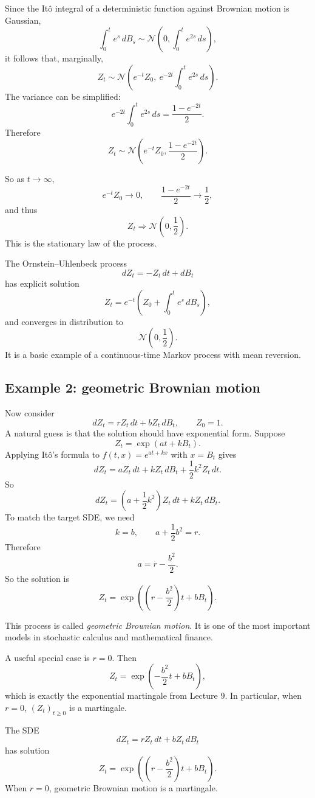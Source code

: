 \documentclass[11pt]{article}
\theoremstyle{definition}
\begin{document}
Since the It\^o integral of a deterministic function against Brownian motion is Gaussian,
\[
\int_0^t e^s\,dB_s
\sim
\mathcal N\!\left(0,\int_0^t e^{2s}\,ds\right),
\]
it follows that, marginally,
\[
Z_t\sim
\mathcal N\!\left(e^{-t}Z_0,\ e^{-2t}\int_0^t e^{2s}\,ds\right).
\]
The variance can be simplified:
\[
e^{-2t}\int_0^t e^{2s}\,ds
=
\frac{1-e^{-2t}}{2}.
\]
Therefore
\[
Z_t\sim \mathcal N\!\left(e^{-t}Z_0,\frac{1-e^{-2t}}{2}\right).
\]

So as $t\to\infty$,
\[
e^{-t}Z_0\to 0,
\qquad
\frac{1-e^{-2t}}{2}\to \frac12,
\]
and thus
\[
Z_t\Longrightarrow \mathcal N\!\left(0,\frac12\right).
\]
This is the stationary law of the process.

\begin{keyformula}
The Ornstein--Uhlenbeck process
\[
dZ_t=-Z_t\,dt+dB_t
\]
has explicit solution
\[
Z_t=e^{-t}\left(Z_0+\int_0^t e^s\,dB_s\right),
\]
and converges in distribution to
\[
\mathcal N\!\left(0,\frac12\right).
\]
It is a basic example of a continuous-time Markov process with mean reversion.
\end{keyformula}

\subsection{Example 2: geometric Brownian motion}

Now consider
\[
dZ_t=rZ_t\,dt+bZ_t\,dB_t,
\qquad Z_0=1.
\]
A natural guess is that the solution should have exponential form. Suppose
\[
Z_t=\exp(at+kB_t).
\]
Applying It\^o's formula to $f(t,x)=e^{at+kx}$ with $x=B_t$ gives
\[
dZ_t=aZ_t\,dt+kZ_t\,dB_t+\frac12 k^2 Z_t\,dt.
\]
So
\[
dZ_t=\left(a+\frac12 k^2\right)Z_t\,dt+kZ_t\,dB_t.
\]
To match the target SDE, we need
\[
k=b,
\qquad
a+\frac12 b^2=r.
\]
Therefore
\[
a=r-\frac{b^2}{2}.
\]
So the solution is
\[
Z_t=\exp\!\left(\left(r-\frac{b^2}{2}\right)t+bB_t\right).
\]

This process is called \emph{geometric Brownian motion}. It is one of the most important models in stochastic calculus and mathematical finance.

A useful special case is $r=0$. Then
\[
Z_t=\exp\!\left(-\frac{b^2}{2}t+bB_t\right),
\]
which is exactly the exponential martingale from Lecture 9. In particular, when $r=0$, $(Z_t)_{t\ge 0}$ is a martingale.

\begin{keyformula}
The SDE
\[
dZ_t=rZ_t\,dt+bZ_t\,dB_t
\]
has solution
\[
Z_t=\exp\!\left(\left(r-\frac{b^2}{2}\right)t+bB_t\right).
\]
When $r=0$, geometric Brownian motion is a martingale.
\end{keyformula}
\end{document}
